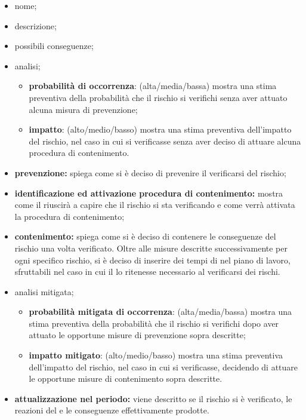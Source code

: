 	 \begin{itemize}
	 \item {nome};
	 \item {descrizione};
	 \item {possibili conseguenze};
	 \item {analisi};
	 	\begin{itemize}
	 	\item \textbf{probabilità di occorrenza}: (alta/media/bassa) mostra una stima preventiva della probabilità che il rischio si verifichi senza aver attuato alcuna misura di prevenzione;
	 	\item \textbf{impatto}: (alto/medio/basso) mostra una stima preventiva dell'impatto del rischio, nel caso in cui si verificasse senza aver deciso di attuare alcuna procedura di contenimento.
	 	\end{itemize}
	 \item \textbf{{prevenzione}:} spiega come si è deciso di prevenire il verificarsi del rischio;
	 \item \textbf{{identificazione ed attivazione procedura di contenimento}:} mostra come il  riuscirà a capire che il rischio si sta verificando e come verrà attivata la procedura di contenimento;
	 \item \textbf{{contenimento}:} spiega come si è deciso di contenere le conseguenze del rischio una volta verificato. Oltre alle misure descritte successivamente per ogni specifico rischio, si è deciso di inserire dei tempi di  nel piano di lavoro, sfruttabili nel caso in cui il \responsabilediprogetto{} lo ritenesse necessario al verificarsi dei rischi.
	 \item {analisi mitigata};
	 \begin{itemize}
	 	\item \textbf{probabilità mitigata di occorrenza}: (alta/media/bassa) mostra una stima preventiva della probabilità che il rischio si verifichi dopo aver attuato le opportune misure di prevenzione sopra descritte;
	 	\item \textbf{impatto mitigato}: (alto/medio/basso) mostra una stima preventiva dell'impatto del rischio, nel caso in cui si verificasse, decidendo di attuare le opportune misure di contenimento sopra descritte.
	 \end{itemize}

	 \item \textbf{{attualizzazione nel periodo}:} viene descritto se il rischio si è verificato, le reazioni del  e le conseguenze effettivamente prodotte.
	 \end{itemize}



